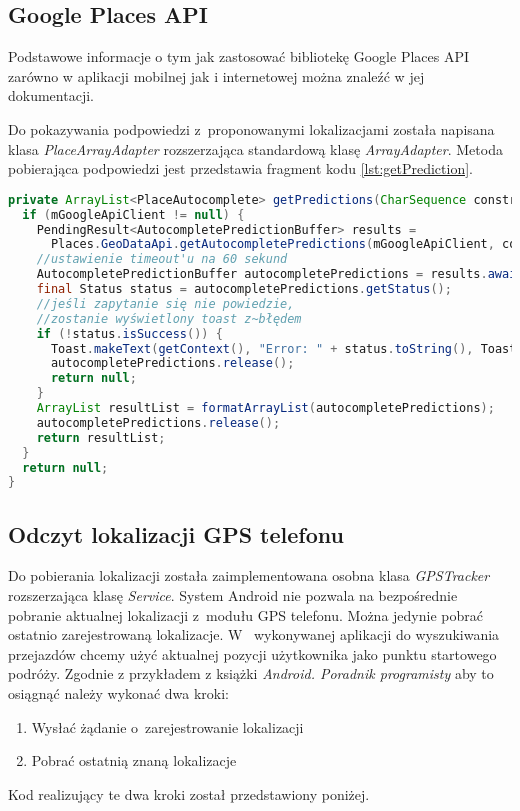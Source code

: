 \documentclass[eng,archivemode]{mgr}
\begin{document}
\subsection{Google Places API}

Podstawowe informacje o tym jak zastosować bibliotekę Google Places API zarówno w aplikacji mobilnej jak i internetowej można znaleźć w jej dokumentacji\cite{google places api guide}.

Do pokazywania podpowiedzi z~proponowanymi lokalizacjami została napisana klasa \textit{PlaceArrayAdapter} rozszerzająca standardową klasę \textit{ArrayAdapter}. Metoda pobierająca podpowiedzi jest przedstawia fragment kodu \ref{lst:getPrediction}.

\begin{lstlisting}[language=java, caption={Pobieranie podpowiedyi z~Google Places API}, label=lst:getPrediction]
private ArrayList<PlaceAutocomplete> getPredictions(CharSequence constraint) {
  if (mGoogleApiClient != null) {
    PendingResult<AutocompletePredictionBuffer> results =
      Places.GeoDataApi.getAutocompletePredictions(mGoogleApiClient, constraint.toString(), mBounds, mPlaceFilter);
    //ustawienie timeout'u na 60 sekund
    AutocompletePredictionBuffer autocompletePredictions = results.await(60, TimeUnit.SECONDS);
    final Status status = autocompletePredictions.getStatus();
    //jeśli zapytanie się nie powiedzie,
    //zostanie wyświetlony toast z~błędem
    if (!status.isSuccess()) {
      Toast.makeText(getContext(), "Error: " + status.toString(), Toast.LENGTH_SHORT).show();
      autocompletePredictions.release();
      return null;
    }
    ArrayList resultList = formatArrayList(autocompletePredictions);
    autocompletePredictions.release();
    return resultList;
  }
  return null;
}
\end{lstlisting}

\subsection{Odczyt lokalizacji GPS telefonu}

Do pobierania lokalizacji została zaimplementowana osobna klasa \textit{GPSTracker} rozszerzająca klasę \textit{Service}. System Android nie pozwala na bezpośrednie pobranie aktualnej lokalizacji z~modułu GPS telefonu. Można jedynie pobrać ostatnio zarejestrowaną lokalizacje. W~ wykonywanej aplikacji do wyszukiwania przejazdów chcemy użyć aktualnej pozycji użytkownika jako punktu startowego podróży. Zgodnie z przykładem z książki \emph{Android. Poradnik programisty}\cite{android} aby to osiągnąć należy wykonać dwa kroki:
\begin{enumerate}
	\item Wysłać żądanie o~zarejestrowanie lokalizacji
	\item Pobrać ostatnią znaną lokalizacje
\end{enumerate}
Kod realizujący te dwa kroki został przedstawiony poniżej.
\end{document}
